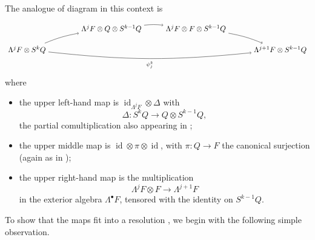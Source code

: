 \documentclass[11pt]{article}
\theoremstyle{plain}
\theoremstyle{nonumberplain}
\theoremstyle{plain}
\numberwithin{equation}{section}
\theoremstyle{nonumberplain}
\newcommand\1{{\bf 1}}
\DeclareMathOperator{\id}{id}
\begin{document}
The analogue of diagram  in this context is
\begin{equation}\label{eq:17}
  \begin{tikzpicture}[auto,baseline=(current  bounding  box.center)]
    \path[anchor=base] (0,0) node (1) {$\Lambda^j F\otimes S^{k}Q$}
    +(4,1) node (2) {$\Lambda^jF\otimes Q\otimes S^{k-1}Q$}
    +(8,1) node (3) {$\Lambda^jF\otimes F\otimes S^{k-1}Q$}
    +(12,0) node (4) {$\Lambda^{j+1}F\otimes S^{k-1}Q$};
    \draw[->] (1) to[bend left=6] node[pos=.5,auto] {$\scriptstyle $} (2);
    \draw[->] (2) to[bend left=6] node[pos=.5,auto] {$\scriptstyle $} (3);
    \draw[->] (1) to[bend right=6] node[pos=.5,auto,swap] {$\scriptstyle \psi_j^k$} (4);
    \draw[->] (3) to[bend left=6] node[pos=.5,auto] {$\scriptstyle $} (4);
  \end{tikzpicture}
\end{equation}
where
\begin{itemize}
\item[$-$] the upper left-hand map is $\id_{\Lambda^jF}\otimes \Delta$ with
  \begin{equation*}
    \Delta:S^kQ\to Q\otimes S^{k-1}Q,
  \end{equation*}
  the partial comultiplication also appearing in ;
\item[$-$] the upper middle map is $\id\otimes\pi\otimes \id$, with $\pi:Q\to F$ the canonical surjection (again as in );
\item[$-$] the upper right-hand map is the multiplication
  \begin{equation*}
    \Lambda^j F\otimes F\to \Lambda^{j+1}F
  \end{equation*}
  in the exterior algebra $\Lambda^{\bullet} F$, tensored with the identity on $S^{k-1}Q$. 
\end{itemize}


To show that the maps  fit into a resolution , we begin with the following simple observation.
\end{document}
